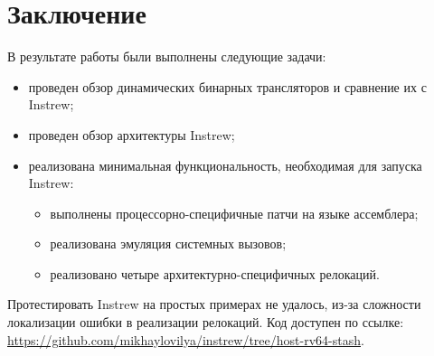 
\section*{Заключение}
В результате работы были выполнены следующие задачи:
\begin{itemize}
    \item проведен обзор динамических бинарных трансляторов и сравнение их с Instrew;
    \item проведен обзор архитектуры Instrew;
    \item реализована минимальная функциональность, необходимая для запуска Instrew:
          \begin{itemize}
              \item выполнены процессорно-специфичные патчи на языке ассемблера;
              \item реализована эмуляция системных вызовов;
              \item реализовано четыре архитектурно-специфичных релокаций.
          \end{itemize}
\end{itemize}

Протестировать Instrew на простых примерах не удалось, из-за сложности локализации ошибки в реализации релокаций.
Код доступен по ссылке: \href{https://github.com/mikhaylovilya/instrew/tree/host-rv64-stash}{https://github.com/mikhaylovilya/instrew/tree/host-rv64-stash}.



